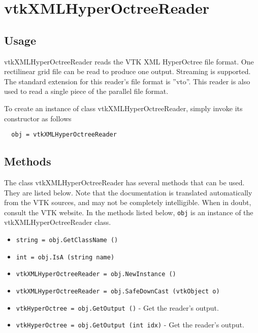 \section{vtkXMLHyperOctreeReader}

\subsection{Usage}

 vtkXMLHyperOctreeReader reads the VTK XML HyperOctree file
 format.  One rectilinear grid file can be read to produce one
 output.  Streaming is supported.  The standard extension for this
 reader's file format is ''vto''.  This reader is also used to read a
 single piece of the parallel file format.

To create an instance of class vtkXMLHyperOctreeReader, simply
invoke its constructor as follows
\begin{verbatim}
  obj = vtkXMLHyperOctreeReader
\end{verbatim}
\subsection{Methods}

The class vtkXMLHyperOctreeReader has several methods that can be used.
  They are listed below.
Note that the documentation is translated automatically from the VTK sources,
and may not be completely intelligible.  When in doubt, consult the VTK website.
In the methods listed below, \verb|obj| is an instance of the vtkXMLHyperOctreeReader class.
\begin{itemize}
\item  \verb|string = obj.GetClassName ()|

\item  \verb|int = obj.IsA (string name)|

\item  \verb|vtkXMLHyperOctreeReader = obj.NewInstance ()|

\item  \verb|vtkXMLHyperOctreeReader = obj.SafeDownCast (vtkObject o)|

\item  \verb|vtkHyperOctree = obj.GetOutput ()| -  Get the reader's output.

\item  \verb|vtkHyperOctree = obj.GetOutput (int idx)| -  Get the reader's output.

\end{itemize}
